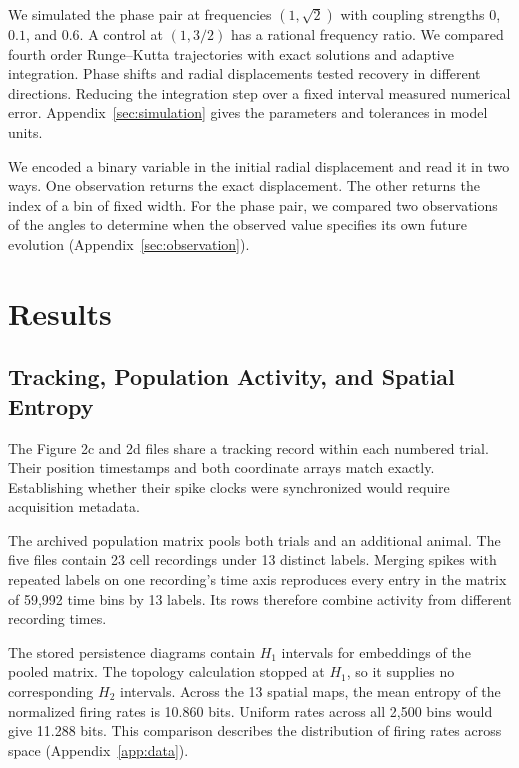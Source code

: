 \documentclass[12pt,a4paper]{article}
\begin{document}
We simulated the phase pair at frequencies $(1,\sqrt{2})$ with coupling strengths $0$, $0.1$, and $0.6$. A control at $(1,3/2)$ has a rational frequency ratio. We compared fourth order Runge--Kutta trajectories with exact solutions and adaptive integration. Phase shifts and radial displacements tested recovery in different directions. Reducing the integration step over a fixed interval measured numerical error. Appendix~\ref{sec:simulation} gives the parameters and tolerances in model units.

We encoded a binary variable in the initial radial displacement and read it in two ways. One observation returns the exact displacement. The other returns the index of a bin of fixed width. For the phase pair, we compared two observations of the angles to determine when the observed value specifies its own future evolution (Appendix~\ref{sec:observation}).

\section{Results}\label{sec:results}

\subsection{Tracking, Population Activity, and Spatial Entropy}\label{sec:empirical}

The Figure 2c and 2d files share a tracking record within each numbered trial. Their position timestamps and both coordinate arrays match exactly. Establishing whether their spike clocks were synchronized would require acquisition metadata.

The archived population matrix pools both trials and an additional animal. The five files contain 23 cell recordings under 13 distinct labels. Merging spikes with repeated labels on one recording's time axis reproduces every entry in the matrix of 59,992 time bins by 13 labels. Its rows therefore combine activity from different recording times.

The stored persistence diagrams contain $H_1$ intervals for embeddings of the pooled matrix. The topology calculation stopped at $H_1$, so it supplies no corresponding $H_2$ intervals. Across the 13 spatial maps, the mean entropy of the normalized firing rates is 10.860 bits. Uniform rates across all 2,500 bins would give 11.288 bits. This comparison describes the distribution of firing rates across space (Appendix~\ref{app:data}).
\end{document}
